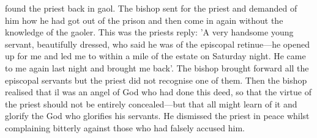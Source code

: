 found the priest back in gaol.
The bishop sent for the priest and
demanded of him how he had got out of the prison and then come
in again without the knowledge of the gaoler.
This was the priest\textquotesingle s
reply: 'A very handsome young servant, beautifully dressed, who
said he was of the episcopal retinue—he opened up for me and led
me to within a mile of the estate on Saturday night.
He came to me
again last night and brought me back'.
The bishop brought forward
all the episcopal servants but the priest did not recognise one of
them.
Then the bishop realised that il was an angel of God who had
done this deed, so that the virtue of the priest should not be entirely
concealed—but that all might learn of it and glorify the God who
glorifies his servants.
He dismissed the priest in peace whilst
complaining bitterly against those who had falsely accused him.


